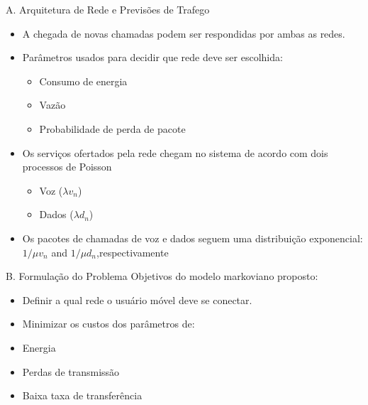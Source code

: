 \begin{frame}
  \begin{block}{A. Arquitetura de Rede e Previsões de Trafego}
    \begin{itemize}
      \item A chegada de novas chamadas podem ser respondidas por ambas as redes.
      \item Parâmetros usados para decidir que rede deve ser escolhida:
      \begin{itemize}
        \item Consumo de energia
        \item Vazão
        \item Probabilidade de perda de pacote
      \end{itemize}
      \item Os serviços ofertados pela rede chegam no sistema de acordo com dois processos de Poisson
      \begin{itemize}
        \item Voz ($ \lambda v _{n} $)
        \item Dados ($ \lambda d _{n} $)
      \end{itemize}
      \item Os pacotes de chamadas de voz e dados seguem uma distribuição exponencial:$ 1 / \mu v _{n} $ and $ 1 / \mu d _{n} $,respectivamente
    \end{itemize}
  \end{block}
\end{frame}

\begin{frame}
  \begin{block}{B. Formulação do Problema}
    Objetivos do modelo markoviano proposto:
    \begin{itemize}
      \item Definir a qual rede o usuário móvel deve se conectar.
      \item Minimizar os custos dos parâmetros de:
      \item \alert{Energia}
      \item \alert{Perdas de transmissão}
      \item \alert{Baixa taxa de transferência}
    \end{itemize}  
  \end{block}  
\end{frame}

